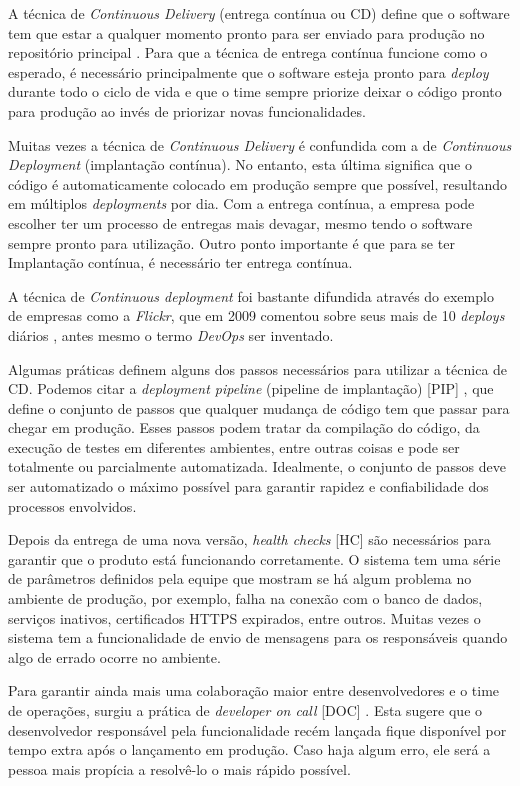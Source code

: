 A técnica de \emph{Continuous Delivery} (entrega contínua ou CD) define que o software tem que estar a qualquer momento pronto para ser enviado para produção no repositório principal \cite{fowlerCD}. Para que a técnica de entrega contínua funcione como o esperado, é necessário principalmente que o software esteja pronto para \emph{deploy} durante todo o ciclo de vida e que o time sempre priorize deixar o código pronto para produção ao invés de priorizar novas funcionalidades.

Muitas vezes a técnica de \emph{Continuous Delivery} é confundida com a de \emph{Continuous Deployment} (implantação contínua). No entanto, esta última significa que o código é automaticamente colocado em produção sempre que possível, resultando em múltiplos \emph{deployments} por dia. Com a entrega contínua, a empresa pode escolher ter um processo de entregas mais devagar, mesmo tendo o software sempre pronto para utilização. Outro ponto importante é que para se ter Implantação contínua, é necessário ter entrega contínua.

A técnica de \emph{Continuous deployment} foi bastante difundida através do exemplo de empresas como a \emph{Flickr}, que em 2009 comentou sobre seus mais de 10 \emph{deploys} diários \cite{flickrTalk}, antes mesmo o termo \emph{DevOps} ser inventado. 

Algumas práticas definem alguns dos passos necessários para utilizar a técnica de CD. Podemos citar a \emph{deployment pipeline} (pipeline de implantação) [PIP] \cite{devopsBook}, que define o conjunto de passos que qualquer mudança de código tem que passar para chegar em produção. Esses passos podem tratar da compilação do código, da execução de testes em diferentes ambientes, entre outras coisas e pode ser totalmente ou parcialmente automatizada. Idealmente, o conjunto de passos deve ser automatizado o máximo possível para garantir rapidez e confiabilidade dos processos envolvidos.

Depois da entrega de uma nova versão, \emph{health checks} [HC] \cite{devopsBook} são necessários para garantir que o produto está funcionando corretamente. O sistema tem uma série de parâmetros definidos pela equipe que mostram se há algum problema no ambiente de produção, por exemplo, falha na conexão com o banco de dados, serviços inativos, certificados HTTPS expirados, entre outros. Muitas vezes o sistema tem a funcionalidade de envio de mensagens para os responsáveis quando algo de errado ocorre no ambiente.

Para garantir ainda mais uma colaboração maior entre desenvolvedores e o time de operações, surgiu a prática de \emph{developer on call} [DOC] \cite{devAndDeploymentFB}. Esta sugere que o desenvolvedor responsável pela funcionalidade recém lançada fique disponível por tempo extra após o lançamento em produção. Caso haja algum erro, ele será a pessoa mais propícia a resolvê-lo o mais rápido possível.

